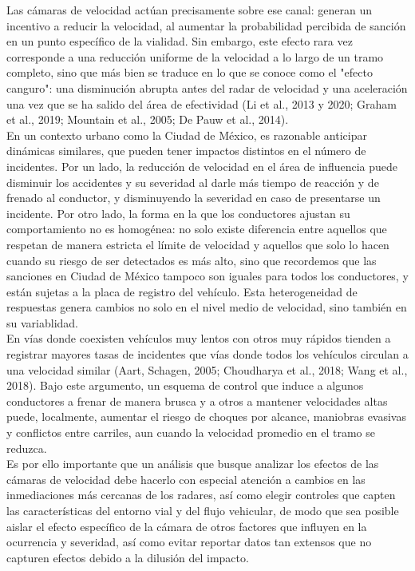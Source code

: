 \indent Las cámaras de velocidad actúan precisamente sobre ese canal: generan un incentivo a reducir la velocidad, al aumentar la probabilidad percibida de sanción en un punto específico de la vialidad. Sin embargo, este efecto rara vez corresponde a una reducción uniforme de la velocidad a lo largo de un tramo completo, sino que más bien se traduce en lo que se conoce como el "efecto canguro": una disminución abrupta antes del radar de velocidad y una aceleración una vez que se ha salido del área de efectividad (Li et al., 2013 y 2020; Graham et al., 2019; Mountain et al., 2005; De Pauw et al., 2014).\\

En un contexto urbano como la Ciudad de México, es razonable anticipar dinámicas similares, que pueden tener impactos distintos en el número de incidentes. Por un lado, la reducción de velocidad en el área de influencia puede disminuir los accidentes y su severidad al darle más tiempo de reacción y de frenado al conductor, y disminuyendo la severidad en caso de presentarse un incidente. Por otro lado, la forma en la que los conductores ajustan su comportamiento no es homogénea: no solo existe diferencia entre aquellos que respetan de manera estricta el límite de velocidad y aquellos que solo lo hacen cuando su riesgo de ser detectados es más alto, sino que recordemos que las sanciones en Ciudad de México tampoco son iguales para todos los conductores, y están sujetas a la placa de registro del vehículo. Esta heterogeneidad de respuestas genera cambios no solo en el nivel medio de velocidad, sino también en su variablidad.\\

En vías donde coexisten vehículos muy lentos con otros muy rápidos tienden a registrar mayores tasas de incidentes que vías donde todos los vehículos circulan a una velocidad similar (Aart, Schagen, 2005; Choudharya et al., 2018; Wang et al., 2018). Bajo este argumento, un esquema de control que induce a algunos conductores a frenar de manera brusca y a otros a mantener velocidades altas puede, localmente, aumentar el riesgo de choques por alcance, maniobras evasivas y conflictos entre carriles, aun cuando la velocidad promedio en el tramo se reduzca.\\ 

Es por ello importante que un análisis que busque analizar los efectos de las cámaras de velocidad debe hacerlo con especial atención a cambios en las inmediaciones más cercanas de los radares, así como elegir controles que capten las características del entorno vial y del flujo vehicular, de modo que sea posible aislar el efecto específico de la cámara de otros factores que influyen en la ocurrencia y severidad, así como evitar reportar datos tan extensos que no capturen efectos debido a la dilusión del impacto.\\ 

